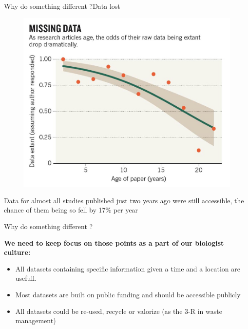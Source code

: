 \documentclass{eecslides}
\begin{document}
\begin{frame}{Why do something different ?}{Data lost}

\begin{figure}[t]
\includegraphics[width=0.50\paperwidth]{Nature_fig.jpg}
\end{figure}

 Data for almost all studies published just two years ago were still accessible, the chance of them being so \alert{fell by 17\% per year}

\end{frame}


\begin{frame}{Why do something different ?}

\textbf{We need to keep focus on those points as a part of our biologist culture:}
	
	\begin{itemize}
		\item \alert{All datasets} containing specific information given a time and a location \alert{are usefull}.
		\item Most datasets are built on \alert{public funding} and should be accessible publicly
		\item All datasets could be re-used, recycle or valorize (as the 3-R in waste management) 
	\end{itemize}


\end{frame}






%	
%		
\end{document}
